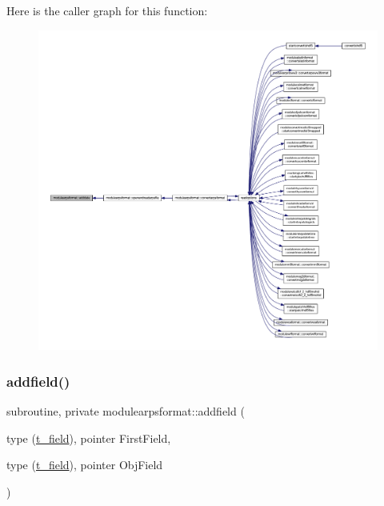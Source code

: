 Here is the caller graph for this function\+:\nopagebreak
\begin{figure}[H]
\begin{center}
\leavevmode
\includegraphics[width=350pt]{namespacemodulearpsformat_a3e7adeca2b8b386d9c8d59f32a8c189f_icgraph}
\end{center}
\end{figure}
\mbox{\label{namespacemodulearpsformat_a32649b9f39dfaa2b5396d488243a3905}} 
\subsubsection{\texorpdfstring{addfield()}{addfield()}}
{\footnotesize\ttfamily subroutine, private modulearpsformat\+::addfield (\begin{DoxyParamCaption}\item[{type (\mbox{\hyperlink{structmodulearpsformat_1_1t__field}{t\+\_\+field}}), pointer}]{First\+Field,  }\item[{type (\mbox{\hyperlink{structmodulearpsformat_1_1t__field}{t\+\_\+field}}), pointer}]{Obj\+Field }\end{DoxyParamCaption})\hspace{0.3cm}{\ttfamily [private]}}


